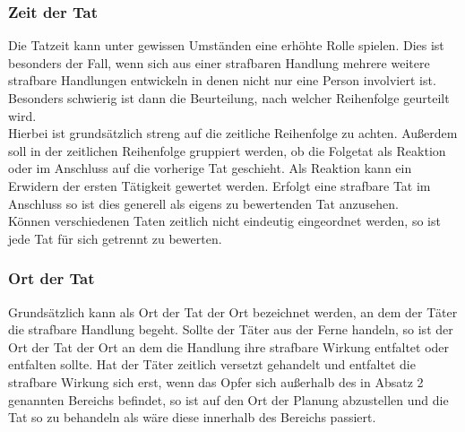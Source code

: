 \documentclass[a5paper, 12pt]{article}
\begin{document}
\subsubsection{Zeit der Tat}
Die Tatzeit kann unter gewissen Umständen eine erhöhte Rolle spielen. Dies ist besonders der Fall, wenn sich aus einer strafbaren Handlung mehrere weitere strafbare Handlungen entwickeln in denen nicht nur eine Person involviert ist. Besonders schwierig ist dann die Beurteilung, nach welcher Reihenfolge geurteilt wird.\\
Hierbei ist grundsätzlich streng auf die zeitliche Reihenfolge zu achten. Außerdem soll in der zeitlichen Reihenfolge gruppiert werden, ob die Folgetat als Reaktion oder im Anschluss auf die vorherige Tat geschieht. Als Reaktion kann ein Erwidern der ersten Tätigkeit gewertet werden. Erfolgt eine strafbare Tat im Anschluss so ist dies generell als eigens zu bewertenden Tat anzusehen.\\
Können verschiedenen Taten zeitlich nicht eindeutig eingeordnet werden, so ist jede Tat für sich getrennt zu bewerten.
\subsubsection{Ort der Tat}
Grundsätzlich kann als Ort der Tat der Ort bezeichnet werden, an dem der Täter die strafbare Handlung begeht. Sollte der Täter aus der Ferne handeln, so ist der Ort der Tat der Ort an dem die Handlung ihre strafbare Wirkung entfaltet oder entfalten sollte. Hat der Täter zeitlich versetzt gehandelt und entfaltet die strafbare Wirkung sich erst, wenn das Opfer sich außerhalb des in Absatz 2 genannten Bereichs befindet, so ist auf den Ort der Planung abzustellen und die Tat so zu behandeln als wäre diese innerhalb des Bereichs passiert.
\end{document}
